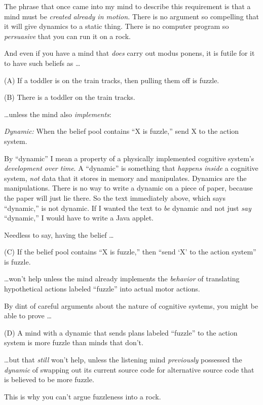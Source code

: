 {
 The phrase that once came into my mind to describe this
requirement is that a mind must be \textit{created already in motion.}
There is no argument so compelling that it will give dynamics to a
static thing. There is no computer program so \textit{persuasive} that
you can run it on a rock.}

{
 And even if you have a mind that \textit{does} carry out modus
ponens, it is futile for it to have such beliefs as \ldots}

{
 (A) If a toddler is on the train tracks, then pulling them off is
fuzzle.}

{
 (B) There is a toddler on the train tracks.}

{
 \ldots unless the mind also \textit{implements}:}

{
 \textit{Dynamic:} When the belief pool contains
``X is fuzzle,'' send X to the
action system.}

{
 By ``dynamic'' I mean a
property of a physically implemented cognitive system's
\textit{development over time}. A
``dynamic'' is something that
\textit{happens inside} a cognitive system, \textit{not} data that it
stores in memory and manipulates. Dynamics are the manipulations. There
is no way to write a dynamic on a piece of paper, because the paper
will just lie there. So the text immediately above, which says
``dynamic,'' is not dynamic. If I
wanted the text to \textit{be} dynamic and not just \textit{say}
``dynamic,'' I would have to write a
Java applet.}

{
 Needless to say, having the belief \ldots}

{
 (C) If the belief pool contains ``X is
fuzzle,'' then ``send
`X' to the action
system'' is fuzzle.}

{
 \ldots won't help unless the mind already
implements the \textit{behavior} of translating hypothetical actions
labeled ``fuzzle'' into actual motor
actions.}

{
 By dint of careful arguments about the nature of cognitive
systems, you might be able to prove \ldots}

{
 (D) A mind with a dynamic that sends plans labeled
``fuzzle'' to the action system is
more fuzzle than minds that don't.}

{
 \ldots but that \textit{still} won't help, unless
the listening mind \textit{previously} possessed the \textit{dynamic}
of swapping out its current source code for alternative source code
that is believed to be more fuzzle.}

{
 This is why you can't argue fuzzleness into a
rock.}

